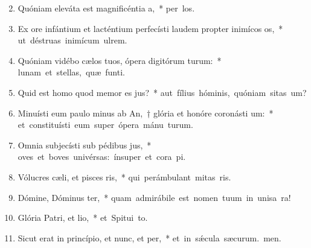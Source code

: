 \begin{flushleft}
\begin{enumerate}[leftmargin=*]
\setcounter{enumi}{1}

\item Quóniam eleváta est magnificéntia a,~* \mbox{per los.}

\item Ex ore infántium et lacténtium perfecísti laudem propter inimícos os,~* \mbox{ut déstruas inimícum  ulrem.}

\item Quóniam vidébo cælos tuos, ópera digitórum turum:~* \mbox{lunam et stellas, quæ  funti.}

\item Quid est homo quod memor es jus?~* \mbox{aut fílius hóminis, quóniam sitas um?}

\item Minuísti eum paulo minus ab An,~† glória et honóre coronásti um:~* \mbox{et constituísti eum super ópera mánu turum.}

\item Omnia subjecísti sub pédibus jus,~* \mbox{oves et boves univérsas: ínsuper et cora pi.}

\item Vólucres cæli, et pisces ris,~* \mbox{qui perámbulant mitas ris.}

\item Dómine, Dóminus ter,~* \mbox{quam admirábile est nomen tuum in unisa ra!}

\item Glória Patri, et lio,~* \mbox{et Spitui to.}

\item Sicut erat in princípio, et nunc, et per,~* \mbox{et in s\'{\ae}cula sæcurum. men.}

\end{enumerate}
\end{flushleft}


